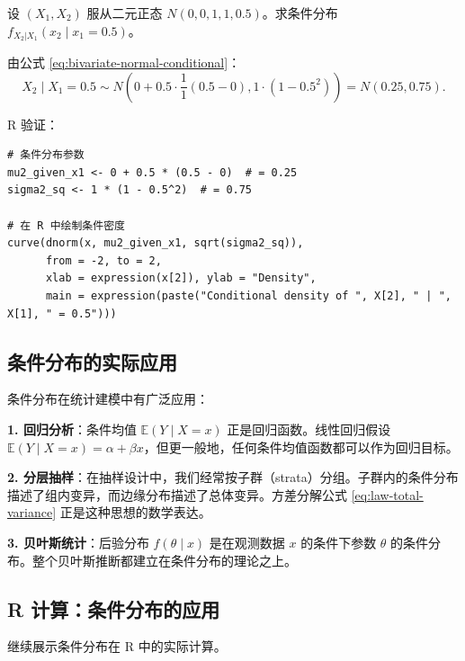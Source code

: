 \begin{example}[连续条件分布]\label{ex:conditional-distribution-continuous-ch2}
设 $(X_1, X_2)$ 服从二元正态 $N(0, 0, 1, 1, 0.5)$。求条件分布 $f_{X_2|X_1}(x_2 \mid x_1 = 0.5)$。

由公式 \eqref{eq:bivariate-normal-conditional}：
\[
X_2 \mid X_1 = 0.5 \sim N\left(0 + 0.5 \cdot \frac{1}{1}(0.5 - 0), 1 \cdot (1-0.5^2)\right) = N(0.25, 0.75).
\]

R 验证：
\begin{verbatim}
# 条件分布参数
mu2_given_x1 <- 0 + 0.5 * (0.5 - 0)  # = 0.25
sigma2_sq <- 1 * (1 - 0.5^2)  # = 0.75

# 在 R 中绘制条件密度
curve(dnorm(x, mu2_given_x1, sqrt(sigma2_sq)),
      from = -2, to = 2,
      xlab = expression(x[2]), ylab = "Density",
      main = expression(paste("Conditional density of ", X[2], " | ", X[1], " = 0.5")))
\end{verbatim}
\end{example}

\subsection{条件分布的实际应用}

条件分布在统计建模中有广泛应用：

\textbf{1. 回归分析}：条件均值 $\mathbb{E}(Y \mid X = x)$ 正是回归函数。线性回归假设 $\mathbb{E}(Y \mid X = x) = \alpha + \beta x$，但更一般地，任何条件均值函数都可以作为回归目标。

\textbf{2. 分层抽样}：在抽样设计中，我们经常按子群（strata）分组。子群内的条件分布描述了组内变异，而边缘分布描述了总体变异。方差分解公式 \eqref{eq:law-total-variance} 正是这种思想的数学表达。

\textbf{3. 贝叶斯统计}：后验分布 $f(\theta \mid x)$ 是在观测数据 $x$ 的条件下参数 $\theta$ 的条件分布。整个贝叶斯推断都建立在条件分布的理论之上。


\subsection{R 计算：条件分布的应用}

继续展示条件分布在 R 中的实际计算。


